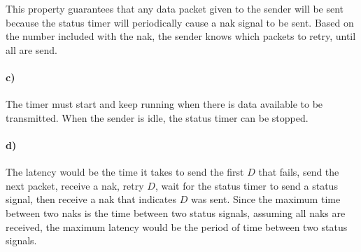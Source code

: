\documentclass[12pt]{article}
\begin{document}
This property guarantees that any data packet given to the sender will be sent because the status timer will periodically cause a nak signal to be sent. Based on the number included with the nak, the
sender knows which packets to retry, until all are send.

\paragraph{c)}

The timer must start and keep running when there is data available to be transmitted. When the sender is idle, the status timer can be stopped.

\paragraph{d)}

The latency would be the time it takes to send the first \(D\) that fails, send the next packet, receive a nak, retry \(D\), wait for the status timer to send a status signal, then receive a nak that
indicates \(D\) was sent. Since the maximum time between two naks is the time between two status signals, assuming all naks are received, the maximum latency would be the period of time between two status signals.
\end{document}
